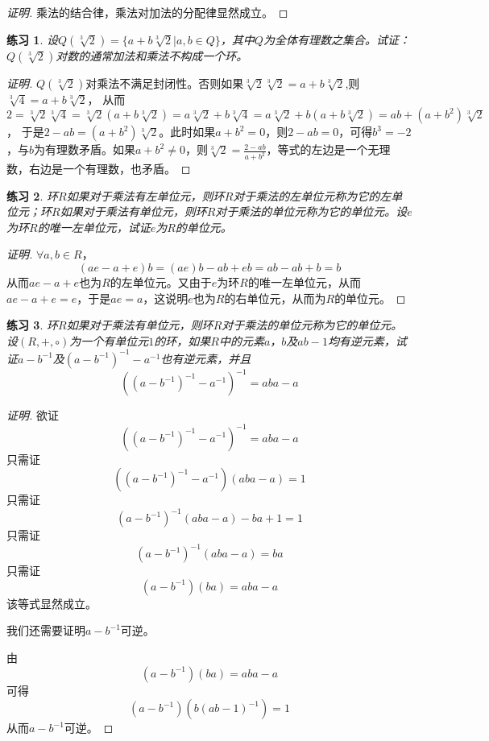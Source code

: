 \documentclass{article}
\newtheorem{Exercise}{练习}
\begin{document}
\begin{CJK*}{UTF8}{gbsn}
\begin{proof}[证明]
  乘法的结合律，乘法对加法的分配律显然成立。
\end{proof}
\begin{Exercise}
  设$Q(\sqrt[3]{2})=\{a+b\sqrt[3]{2}|a,b\in Q\}$，其中$Q$为全体有理数之集合。试证：$Q(\sqrt[3]{2})$对数的通常加法和乘法不构成一个环。
\end{Exercise}
\begin{proof}[证明]
  $Q(\sqrt[3]{2})$对乘法不满足封闭性。否则如果$\sqrt[3]{2}\sqrt[3]{2}=a+b\sqrt[3]{2}$,则$\sqrt[3]{4}=a+b\sqrt[3]{2}$，
  从而$2=\sqrt[3]{2}\sqrt[3]{4}=\sqrt[3]{2}(a+b\sqrt[3]{2})=a\sqrt[3]{2}+b\sqrt[3]{4}=a\sqrt[3]{2}+b(a+b\sqrt[3]{2})=ab+(a+b^2)\sqrt[3]{2}$，
  于是$2-ab=(a+b^2)\sqrt[3]{2}$。此时如果$a+b^2=0$，则$2-ab=0$，可得$b^3=-2$，与$b$为有理数矛盾。如果$a+b^2\neq 0$，则$\sqrt[3]{2}=\frac{2-ab}{a+b^2}$，等式的左边是一个无理数，右边是一个有理数，也矛盾。
\end{proof}
\begin{Exercise}
  环$R$如果对于乘法有左单位元，则环$R$对于乘法的左单位元称为它的左单位元；环$R$如果对于乘法有单位元，则环$R$对于乘法的单位元称为它的单位元。设$e$为环$R$的唯一左单位元，试证$e$为$R$的单位元。
\end{Exercise}
\begin{proof}[证明]
  $\forall a,b\in R$，
  \[(ae-a+e)b=(ae)b-ab+eb=ab-ab+b=b\]
  从而$ae-a+e$也为$R$的左单位元。又由于$e$为环$R$的唯一左单位元，从而$ae-a+e=e$，于是$ae=a$，这说明$e$也为$R$的右单位元，从而为$R$的单位元。
\end{proof}
\begin{Exercise}
  环$R$如果对于乘法有单位元，则环$R$对于乘法的单位元称为它的单位元。设$(R,+,\circ)$为一个有单位元$1$的环，如果$R$中的元素$a$，$b$及$ab-1$均有逆元素，试证$a-b^{-1}$及$(a-b^{-1})^{-1}-a^{-1}$也有逆元素，并且
\[((a-b^{-1})^{-1}-a^{-1})^{-1}=aba-a\]
\end{Exercise}
\begin{proof}[证明]
  欲证
  \[((a-b^{-1})^{-1}-a^{-1})^{-1}=aba-a\]
  只需证
  \[((a-b^{-1})^{-1}-a^{-1})(aba-a)=1\]
  只需证
  \[(a-b^{-1})^{-1}(aba-a)-ba+1=1\]
  只需证
  \[(a-b^{-1})^{-1}(aba-a)=ba\]
  只需证
  \[(a-b^{-1})(ba)=aba-a\]
  该等式显然成立。

  我们还需要证明$a-b^{-1}$可逆。

  由
  \[(a-b^{-1})(ba)=aba-a\]
  可得
  \[(a-b^{-1})(b(ab-1)^{-1})=1\]
  从而$a-b^{-1}$可逆。


\end{proof}
\end{CJK*}
\end{document}

